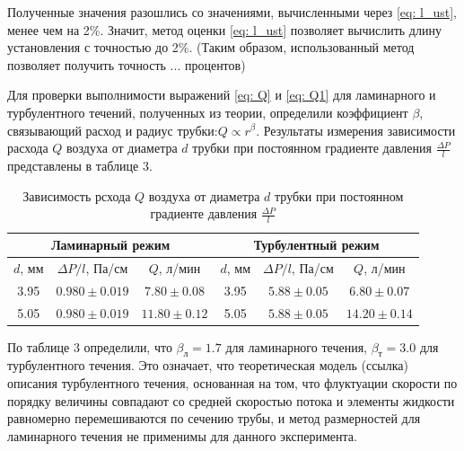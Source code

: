 Полученные значения разошлись со значениями, вычисленными через \eqref{eq: l_ust}, менее чем на 2\%. Значит, метод оценки \eqref{eq: l_ust} позволяет вычислить длину установления с точностью до 2\%. (Таким образом, использованный метод позволяет получить точность ... процентов)

Для проверки выполнимости выражений \eqref{eq: Q} и \eqref{eq: Q1} для ламинарного и турбулентного течений, полученных из теории, определили коэффициент $\beta$, связывающий расход и радиус трубки:$Q \propto r^\beta$. Результаты измерения зависимости расхода $Q$ воздуха от диаметра $d$ трубки при постоянном градиенте давления $\frac{\Delta P}{l}$ представлены в таблице 3.

\begin{table}[ht]
\centering
\label{tab:flow_regimes}
\begin{tabular}{|c|c|c|c|c|c|}
\hline
\multicolumn{3}{|c|}{\textbf{Ламинарный режим}} & \multicolumn{3}{c|}{\textbf{Турбулентный режим}} \\ \hline
$d$, мм & $\Delta P/l$, Па/см & $Q$, л/мин & $d$, мм & $\Delta P/l$, Па/см & $Q$, л/мин \\ \hline
3.95 & $0.980 \pm 0.019$ & $7.80 \pm 0.08$ & 3.95 & $5.88 \pm 0.05$ & $6.80 \pm 0.07$ \\ \hline
5.05 & $0.980 \pm 0.019$ & $11.80 \pm 0.12$ & 5.05 & $5.88 \pm 0.05$ & $14.20 \pm 0.14$ \\ \hline
\end{tabular}
\caption{Зависимость рсхода $Q$ воздуха от диаметра $d$ трубки при постоянном градиенте давления $\frac{\Delta P}{l}$}
\end{table}
\newpage
По таблице 3 определили, что $\beta_{\text{л}} = 1.7$ для ламинарного течения, $\beta_{\text{т}} = 3.0$ для турбулентного течения. Это означает, что теоретическая модель (ссылка) описания турбулентного течения, основанная на том, что флуктуации скорости по порядку величины совпадают со средней скоростью потока и элементы жидкости равномерно перемешиваются по сечению трубы, и метод размерностей для ламинарного течения не применимы для данного эксперимента.